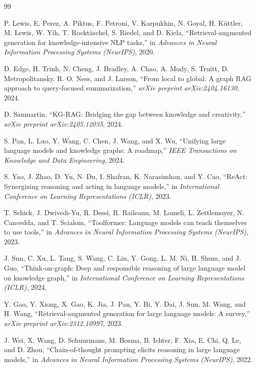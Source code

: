 \documentclass{article}
\begin{document}
\small

\begin{thebibliography}{99}

 P. Lewis, E. Perez, A. Piktus, F. Petroni, V. Karpukhin, N. Goyal, H. K\"uttler, M. Lewis, W. Yih, T. Rockt\"aschel, S. Riedel, and D. Kiela, ``Retrieval-augmented generation for knowledge-intensive NLP tasks,'' in \emph{Advances in Neural Information Processing Systems (NeurIPS)}, 2020.

 D. Edge, H. Trinh, N. Cheng, J. Bradley, A. Chao, A. Mody, S. Truitt, D. Metropolitansky, R. O. Ness, and J. Larson, ``From local to global: A graph RAG approach to query-focused summarization,'' \emph{arXiv preprint arXiv:2404.16130}, 2024.

 D. Sanmartin, ``KG-RAG: Bridging the gap between knowledge and creativity,'' \emph{arXiv preprint arXiv:2405.12035}, 2024.

 S. Pan, L. Luo, Y. Wang, C. Chen, J. Wang, and X. Wu, ``Unifying large language models and knowledge graphs: A roadmap,'' \emph{IEEE Transactions on Knowledge and Data Engineering}, 2024.

 S. Yao, J. Zhao, D. Yu, N. Du, I. Shafran, K. Narasimhan, and Y. Cao, ``ReAct: Synergizing reasoning and acting in language models,'' in \emph{International Conference on Learning Representations (ICLR)}, 2023.

 T. Schick, J. Dwivedi-Yu, R. Dess\`i, R. Raileanu, M. Lomeli, L. Zettlemoyer, N. Cancedda, and T. Scialom, ``Toolformer: Language models can teach themselves to use tools,'' in \emph{Advances in Neural Information Processing Systems (NeurIPS)}, 2023.

 J. Sun, C. Xu, L. Tang, S. Wang, C. Lin, Y. Gong, L. M. Ni, H. Shum, and J. Guo, ``Think-on-graph: Deep and responsible reasoning of large language model on knowledge graph,'' in \emph{International Conference on Learning Representations (ICLR)}, 2024.

 Y. Gao, Y. Xiong, X. Gao, K. Jia, J. Pan, Y. Bi, Y. Dai, J. Sun, M. Wang, and H. Wang, ``Retrieval-augmented generation for large language models: A survey,'' \emph{arXiv preprint arXiv:2312.10997}, 2023.

 J. Wei, X. Wang, D. Schuurmans, M. Bosma, B. Ichter, F. Xia, E. Chi, Q. Le, and D. Zhou, ``Chain-of-thought prompting elicits reasoning in large language models,'' in \emph{Advances in Neural Information Processing Systems (NeurIPS)}, 2022.


\end{thebibliography}
\end{document}
